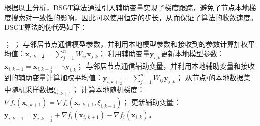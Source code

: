 根据以上分析，DSGT算法通过引入辅助变量实现了梯度跟踪，避免了节点本地梯度搜索对一致性的影响，因此可以使用恒定的步长，从而保证了算法的收敛速度。DSGT算法的伪代码如下：
\begin{center}
    \begin{algorithm}[!htbp]
            \caption{节点$i$上的DSGT算法} 
            \label{Algorithm-DSGT} 
            \begin{algorithmic}[1]
            ；
            ；
                \STATE 与邻居节点通信模型参数，并利用本地模型参数和接收到的参数计算加权平均值：$\boldsymbol{x}_{i,k+\frac{1}{2}}=\sum_{j=1}^n{W_{ij}\boldsymbol{x}_{j,k}}$；
                \STATE 利用辅助变量$\boldsymbol{y}_{i,k}$更新本地模型参数：$\boldsymbol{x}_{i,k+1}=\boldsymbol{x}_{i,k+\frac{1}{2}}-\gamma \boldsymbol{y}_{i,k}$；
                \STATE 与邻居节点通信辅助变量，并利用本地辅助变量和接收到的辅助变量计算加权平均值：$\boldsymbol{y}_{i,k+\frac{1}{2}}=\sum_{j=1}^n{W_{ij}\boldsymbol{y}_{j,k}}$；
                \STATE 从节点$i$的本地数据集中随机采样数据$\xi _{i,k+1} $；
                \STATE 计算本地随机梯度：$\nabla f_i\left( \boldsymbol{x}_{i,k+1} \right) =\nabla f_i\left( \boldsymbol{x}_{i,k+1},\xi _{i,k+1} \right) $；
                \STATE 更新辅助变量：$\boldsymbol{y}_{i,k+1}=\boldsymbol{y}_{i,k+\frac{1}{2}}+\nabla f_i\left( \boldsymbol{x}_{i,k+1} \right) -\nabla f_i\left( \boldsymbol{x}_{i,k} \right) $。
            \ENDFOR            
            \end{algorithmic}
    \end{algorithm}
\end{center}


